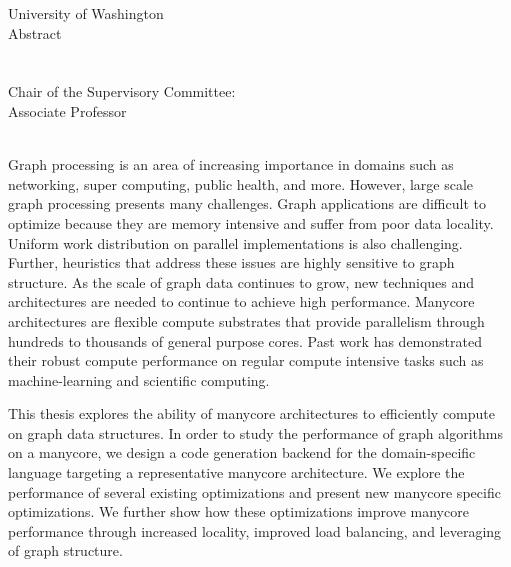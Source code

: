 \begingroup
\let\clearpage\relax
\let\cleardoublepage\relax
\let\cleardoublepage\relax

\thispagestyle{empty}
\begin{center}
    University of Washington \\ \bigskip
    Abstract \\
    \bigskip
    {\color{CTtitle}\spacedallcaps{\myTitle} \\ \bigskip
    }
    \bigskip
    \myName \\
    \bigskip
    Chair of the Supervisory Committee: \\
    Associate Professor \myChair \\
    \myDepartment \\
    \bigskip
\end{center}




\endgroup

Graph processing is an area of increasing importance in domains such as networking, super computing, public health, and more.
However, large scale graph processing presents many challenges.
Graph applications are difficult to optimize because they are memory intensive and suffer from poor data locality.
Uniform work distribution on parallel implementations is also challenging.
Further, heuristics that address these issues are highly sensitive to graph structure.
As the scale of graph data continues to grow, new techniques and architectures are needed to continue to achieve high performance.
Manycore architectures are flexible compute substrates that provide parallelism through hundreds to thousands of general purpose cores.
Past work has demonstrated their robust compute performance on regular compute intensive tasks such as machine-learning and scientific computing.

This thesis explores the ability of manycore architectures to efficiently compute on graph data structures.
In order to study the performance of graph algorithms on a manycore, we design a code generation backend for the \graphit domain-specific language targeting a representative manycore architecture.
We explore the performance of several existing optimizations and present new manycore specific optimizations.
We further show how these optimizations improve manycore performance through increased locality, improved load balancing, and leveraging of graph structure.

